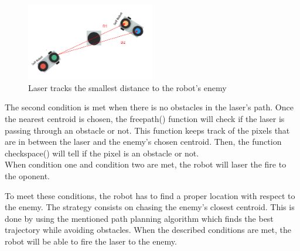\begin{figure}[thb]
    \centering
    \includegraphics[width=0.5\textwidth]{images/laser_track.png}
    \caption[laser tracking]{Laser tracks the smallest distance to the robot's enemy}\label{laser_track}
\end{figure}

The second condition is met when there is no obstacles in the laser's path. Once the nearest centroid is chosen, the freepath() function will check if the laser is passing through an obstacle or not. This function keeps track of the pixels that are in between the laser and the enemy's chosen centroid. Then, the function checkspace() will tell if the pixel is an obstacle or not.\\
When condition one and condition two are met, the robot will laser the fire to the oponent.

To meet these conditions, the robot has to find a proper location with respect to the enemy. The strategy consists on chasing the enemy's closest centroid. This is done by using the mentioned path planning algorithm which finds the best trajectory while avoiding obstacles. When the described conditions are met, the robot will be able to fire the laser to the enemy.

